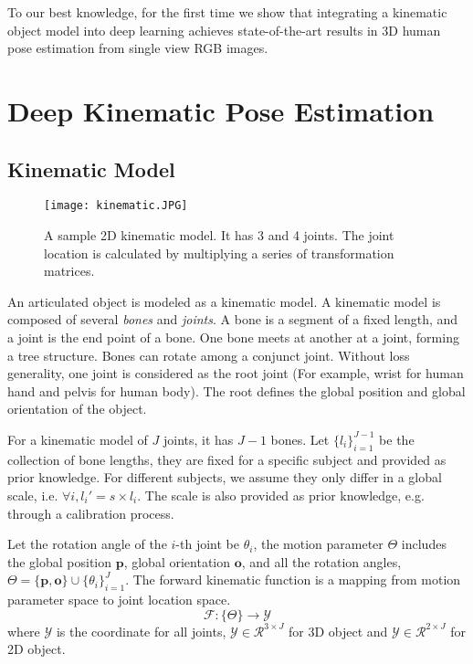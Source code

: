 \documentclass[runningheads]{llncs}
\begin{document}
To our best knowledge, for the first time we show that integrating a kinematic object model into deep learning achieves state-of-the-art results in 3D human pose estimation from single view RGB images.

\section{Deep Kinematic Pose Estimation}
\subsection{Kinematic Model}

\begin{figure}
\begin{center}
\texttt{[image: kinematic.JPG]}
\end{center}
   \caption{A sample 2D kinematic model. It has 3 and 4 joints. The joint location is calculated by multiplying a series of transformation matrices.}
\label{fig:kinematic}
\end{figure}

An articulated object is modeled as a kinematic model. A kinematic model is composed of several \emph{bones} and \emph{joints}. A bone is a segment of a fixed length, and a joint is the end point of a bone. One bone meets at another at a joint, forming a tree structure. Bones can rotate among a conjunct joint. Without loss generality, one joint is considered as the root joint (For example, wrist for human hand and pelvis for human body). The root defines the global position and global orientation of the object.

For a kinematic model of $J$ joints, it has $J - 1$ bones. Let $\{l_i\}_{i = 1} ^ {J - 1}$ be the collection of bone lengths, they are fixed for a specific subject and provided as prior knowledge. For different subjects, we assume they only differ in a global scale, i.e. $ \forall i, l_i' = s \times l_i$. The scale is also provided as prior knowledge, e.g. through a calibration process.


Let the rotation angle of the $i$-th joint be $\theta_i$, the motion parameter $\Theta$ includes the global position $\textbf{p}$, global orientation $\textbf{o}$, and all the rotation angles, $\Theta = \{\textbf{p}, \textbf{o}\} \cup \{\theta_i\}_{i = 1} ^ J$. The forward kinematic function is a mapping from motion parameter space to joint location space.
\begin{equation} \label{eq:map}
\mathcal{F}: \{\Theta\} \rightarrow \mathcal{Y}
\end{equation}
where $\mathcal{Y}$ is the coordinate for all joints, $\mathcal{Y} \in \mathcal{R} ^ {3 \times J}$ for 3D object and $\mathcal{Y} \in \mathcal{R} ^ {2 \times J}$ for 2D object.
\end{document}
